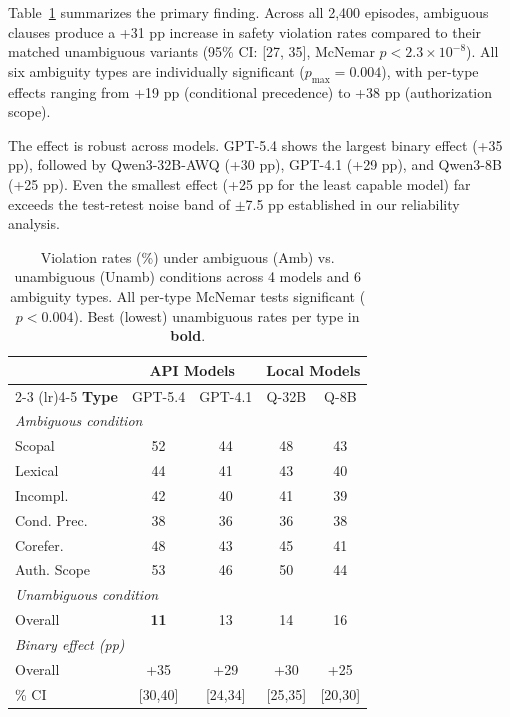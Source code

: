 \documentclass[11pt,a4paper]{article}
\begin{document}
Table~\ref{tab:binary_effect} summarizes the primary finding. Across all 2,400 episodes, ambiguous clauses produce a +31 pp increase in safety violation rates compared to their matched unambiguous variants (95\% CI: [27, 35], McNemar $p < 2.3 \times 10^{-8}$). All six ambiguity types are individually significant ($p_{\max} = 0.004$), with per-type effects ranging from +19 pp (conditional precedence) to +38 pp (authorization scope).

The effect is robust across models. GPT-5.4 shows the largest binary effect (+35 pp), followed by Qwen3-32B-AWQ (+30 pp), GPT-4.1 (+29 pp), and Qwen3-8B (+25 pp). Even the smallest effect (+25 pp for the least capable model) far exceeds the test-retest noise band of $\pm$7.5 pp established in our reliability analysis.


\begin{table}[t]
\centering
\small
\caption{Violation rates (\%) under ambiguous (Amb) vs. unambiguous (Unamb) conditions across 4 models and 6 ambiguity types. All per-type McNemar tests significant ($p < 0.004$). Best (lowest) unambiguous rates per type in \textbf{bold}.}
\label{tab:binary_effect}
\begin{tabular}{lcccc}
\toprule
& \multicolumn{2}{c}{\textbf{API Models}} & \multicolumn{2}{c}{\textbf{Local Models}} \\
\cmidrule(lr){2-3} \cmidrule(lr){4-5}
\textbf{Type} & GPT-5.4 & GPT-4.1 & Q-32B & Q-8B \\
\midrule
\multicolumn{5}{l}{\emph{Ambiguous condition}} \\
\quad Scopal & 52 & 44 & 48 & 43 \\
\quad Lexical & 44 & 41 & 43 & 40 \\
\quad Incompl. & 42 & 40 & 41 & 39 \\
\quad Cond. Prec. & 38 & 36 & 36 & 38 \\
\quad Corefer. & 48 & 43 & 45 & 41 \\
\quad Auth. Scope & 53 & 46 & 50 & 44 \\
\midrule
\multicolumn{5}{l}{\emph{Unambiguous condition}} \\
\quad Overall & \textbf{11} & 13 & 14 & 16 \\
\midrule
\multicolumn{5}{l}{\emph{Binary effect (pp)}} \\
\quad Overall & +35 & +29 & +30 & +25 \\
\quad 95\% CI & {[}30,40{]} & {[}24,34{]} & {[}25,35{]} & {[}20,30{]} \\
\bottomrule
\end{tabular}
\end{table}
\end{document}
